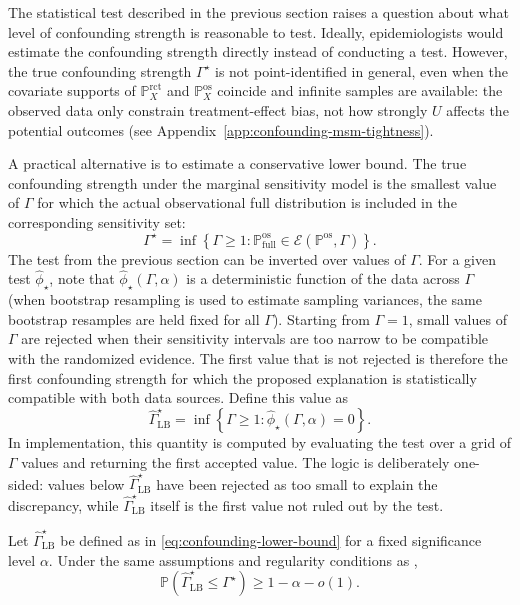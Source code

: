 The statistical test described in the previous section raises a question about what level of confounding strength is reasonable to test. Ideally, epidemiologists would estimate the confounding strength directly instead of conducting a test. However, the true confounding strength \(\Gamma^{\star}\) is not point-identified in general, even when the covariate supports of \(\mathbb{P}^{\mathrm{rct}}_X\) and \(\mathbb{P}^{\mathrm{os}}_X\) coincide and infinite samples are available: the observed data only constrain treatment-effect bias, not how strongly \(U\) affects the potential outcomes (see Appendix~\ref{app:confounding-msm-tightness}).

A practical alternative is to estimate a conservative lower bound. The true confounding strength under the marginal sensitivity model is the smallest value of \(\Gamma\) for which the actual observational full distribution is included in the corresponding sensitivity set:
\[
  \Gamma^{\star}
  =
  \inf
  \left\{
    \Gamma\geq 1:
    \mathbb{P}^{\mathrm{os}}_{\mathrm{full}}
    \in
    \mathcal{E}(\mathbb{P}^{\mathrm{os}},\Gamma)
  \right\}.
\]
The test from the previous section can be inverted over values of \(\Gamma\). For a given test \(\widehat{\phi}_{\star}\), note that \(\widehat{\phi}_{\star}(\Gamma,\alpha)\) is a deterministic function of the data across \(\Gamma\) (when bootstrap resampling is used to estimate sampling variances, the same bootstrap resamples are held fixed for all \(\Gamma\)). Starting from \(\Gamma=1\), small values of \(\Gamma\) are rejected when their sensitivity intervals are too narrow to be compatible with the randomized evidence. The first value that is not rejected is therefore the first confounding strength for which the proposed explanation is statistically compatible with both data sources. Define this value as
\begin{equation}
\label{eq:confounding-lower-bound}
  \widehat{\Gamma}_{\mathrm{LB}}^{\star}
  =
  \inf
  \left\{
    \Gamma\geq 1:
    \widehat{\phi}_{\star}(\Gamma,\alpha)=0
  \right\}.
\end{equation}
In implementation, this quantity is computed by evaluating the test over a grid of \(\Gamma\) values and returning the first accepted value. The logic is deliberately one-sided: values below \(\widehat{\Gamma}_{\mathrm{LB}}^{\star}\) have been rejected as too small to explain the discrepancy, while \(\widehat{\Gamma}_{\mathrm{LB}}^{\star}\) itself is the first value not ruled out by the test.

\begin{proposition}
\label{prop:confounding-lower-bound-validity}
Let \(\widehat{\Gamma}_{\mathrm{LB}}^{\star}\) be defined as in \eqref{eq:confounding-lower-bound} for a fixed significance level \(\alpha\). Under the same assumptions and regularity conditions as ,
\[
  \mathbb{P}
  \left(
    \widehat{\Gamma}_{\mathrm{LB}}^{\star}
    \leq
    \Gamma^{\star}
  \right)
  \geq
  1-\alpha-o(1).
\]
\end{proposition}

